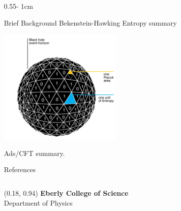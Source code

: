 \documentclass{../psuposter}
\begin{document}
\begin{frame}
\begin{columns}
\begin{column}{0.55\textwidth - 1cm}
    \begin{block}{Brief Background}
        Bekenstein-Hawking Entropy summary
        \cite{baggioliGravityHolographyApplications}
        \begin{center}
	    	\includegraphics[width=0.45\textwidth]{images/bekenstein-hawking-entropy}    		
    	\end{center}
		Ads/CFT summary.
        \cite{zayasMicroscopicAccountBlack2020}

    \end{block}


    \begin{block}{References}
        
		
    \end{block}

\end{column}
\end{columns}


\begin{textblock}{0.5}(0.18, 0.94)
    \color{white}
    \sffamily
    \textbf{Eberly College of Science}
    \\
    Department of Physics
\end{textblock}


\end{frame}
\end{document}
